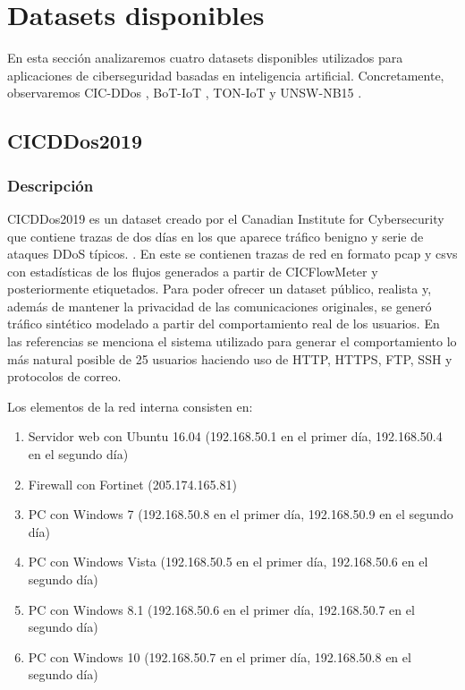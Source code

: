 \section{Datasets disponibles}

En esta sección analizaremos cuatro datasets disponibles utilizados para aplicaciones de ciberseguridad basadas en inteligencia artificial. Concretamente, observaremos CIC-DDos \cite{8888419}, BoT-IoT \cite{DBLP:journals/corr/abs-1811-00701} \cite{10.1007/978-3-319-90775-8_3} \cite{KORONIOTIS202091} \cite{DBLP:journals/corr/abs-2005-00722} \cite{9252856} \cite{phdbotiot}, TON-IoT \cite{MOUSTAFA2021102994} \cite{9444348} \cite{9189760} \cite{9343133} \cite{9343084} \cite{moustafa2019systemic} \cite{ASHRAF2021103041} y UNSW-NB15 \cite{7348942} \cite{doi:10.1080/19393555.2015.1125974} \cite{7948715} \cite{Moustafa2017} \cite{10.1007/978-3-030-72802-1_9}.

\subsection{CICDDos2019}

\subsubsection{Descripción}

CICDDos2019 es un dataset creado por el Canadian Institute for Cybersecurity que contiene trazas de dos días en los que aparece tráfico benigno y serie de ataques DDoS típicos. \cite{cicddos2019web}. En este se contienen trazas de red en formato pcap y csvs con estadísticas de los flujos generados a partir de CICFlowMeter y posteriormente etiquetados. Para poder ofrecer un dataset público, realista y, además de mantener la privacidad de las comunicaciones originales, se generó tráfico sintético modelado a partir del comportamiento real de los usuarios. En las referencias se menciona el sistema utilizado para generar el comportamiento lo más natural posible de 25 usuarios haciendo uso de HTTP, HTTPS, FTP, SSH y protocolos de correo.

Los elementos de la red interna consisten en:

\begin{enumerate}
    \item Servidor web con Ubuntu 16.04 (192.168.50.1 en el primer día, 192.168.50.4 en el segundo día)
    \item Firewall con Fortinet (205.174.165.81)
    \item PC con Windows 7 (192.168.50.8 en el primer día, 192.168.50.9 en el segundo día)
    \item PC con Windows Vista (192.168.50.5 en el primer día, 192.168.50.6 en el segundo día)
    \item PC con Windows 8.1 (192.168.50.6 en el primer día, 192.168.50.7 en el segundo día)
    \item PC con Windows 10 (192.168.50.7 en el primer día, 192.168.50.8 en el segundo día)
\end{enumerate}

